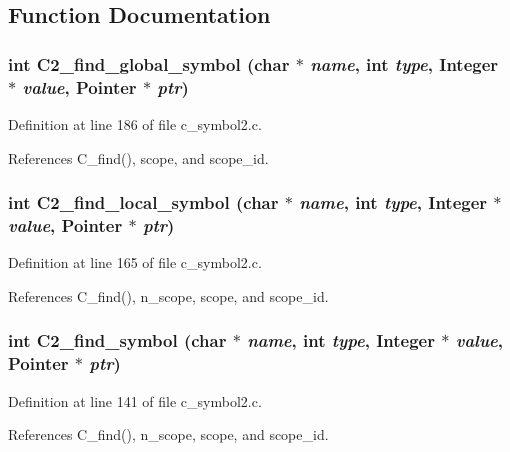 \subsection{Function Documentation}
\subsubsection{\setlength{\rightskip}{0pt plus 5cm}int C2\_\-find\_\-global\_\-symbol (char $\ast$ {\em name}, int {\em type}, \bf{Integer} $\ast$ {\em value}, \bf{Pointer} $\ast$ {\em ptr})}\label{c__symbol2_8c_ce350e8f490545882fcf082a3adfc449}




Definition at line 186 of file c\_\-symbol2.c.

References C\_\-find(), scope, and scope\_\-id.
\subsubsection{\setlength{\rightskip}{0pt plus 5cm}int C2\_\-find\_\-local\_\-symbol (char $\ast$ {\em name}, int {\em type}, \bf{Integer} $\ast$ {\em value}, \bf{Pointer} $\ast$ {\em ptr})}\label{c__symbol2_8c_b7b5d5863b495f23cf2379354b71c5b0}




Definition at line 165 of file c\_\-symbol2.c.

References C\_\-find(), n\_\-scope, scope, and scope\_\-id.
\subsubsection{\setlength{\rightskip}{0pt plus 5cm}int C2\_\-find\_\-symbol (char $\ast$ {\em name}, int {\em type}, \bf{Integer} $\ast$ {\em value}, \bf{Pointer} $\ast$ {\em ptr})}\label{c__symbol2_8c_e9d0d86d97adc2c75d662f070cc39f6b}




Definition at line 141 of file c\_\-symbol2.c.

References C\_\-find(), n\_\-scope, scope, and scope\_\-id.
